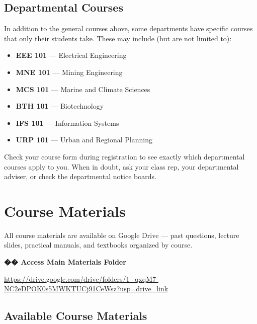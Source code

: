\documentclass[11pt,a4paper]{article}
\begin{document}
\subsection*{Departmental Courses}

In addition to the general courses above, some departments have specific courses that only their students take. These may include (but are not limited to):

\begin{itemize}[leftmargin=1.5em, itemsep=0.2em]
    \item \textbf{EEE 101} --- Electrical Engineering
    \item \textbf{MNE 101} --- Mining Engineering
    \item \textbf{MCS 101} --- Marine and Climate Sciences
    \item \textbf{BTH 101} --- Biotechnology
    \item \textbf{IFS 101} --- Information Systems
    \item \textbf{URP 101} --- Urban and Regional Planning
\end{itemize}

Check your course form during registration to see exactly which departmental courses apply to you. When in doubt, ask your class rep, your departmental adviser, or check the departmental notice boards.
\newpage
\section{Course Materials}

All course materials are available on Google Drive --- past questions, lecture slides, practical manuals, and textbooks organized by course.

\begin{tcolorbox}[colback=lightGray, colframe=primary, arc=4pt]
    \textbf{\color{primary}\Large �� Access Main Materials Folder}

    \vspace{0.5em}

    \url{https://drive.google.com/drive/folders/1_qxqM7-NC2eDPOK0s5MWKTUCj91CeWsz?usp=drive_link}
\end{tcolorbox}

\subsection*{Available Course Materials}
\end{document}
